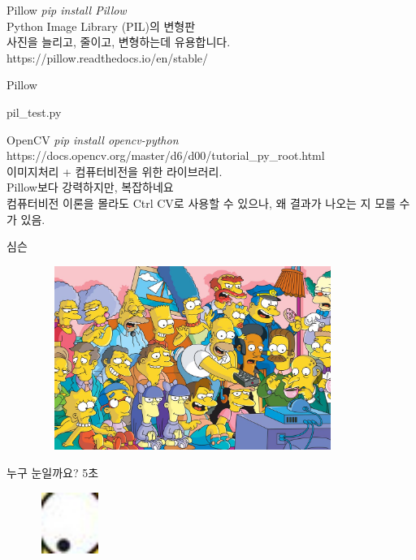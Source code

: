 \documentclass{beamer}
\begin{document}
\begin{frame}{Pillow}
\textit{pip install Pillow}\\
Python Image Library (PIL)의 변형판\\
사진을 늘리고, 줄이고, 변형하는데 유용합니다.\\
https://pillow.readthedocs.io/en/stable/
\end{frame}

\begin{frame}{Pillow}
\begin{lstinputlisting}
  {pil_test.py}
\end{lstinputlisting}
\end{frame}

\begin{frame}{OpenCV}
\textit{pip install opencv-python}\\
https://docs.opencv.org/master/d6/d00/tutorial\_py\_root.html\\
이미지처리 + 컴퓨터비전을 위한 라이브러리.\\
Pillow보다 강력하지만, 복잡하네요\\
컴퓨터비전 이론을 몰라도 Ctrl CV로 사용할 수 있으나, 왜 결과가 나오는 지 모를 수가 있음.
\end{frame}

\begin{frame}{심슨}
\begin{figure}[H]
  \centering
  \includegraphics[width=100mm,height=60mm]{simpsons.jpeg}
\end{figure}
\end{frame}

\begin{frame}{누구 눈일까요? 5초}
\begin{figure}[H]
  \centering
  \includegraphics[width=20mm,height=20mm]{eyes3.jpeg}
\end{figure}
\end{frame}
\end{document}
